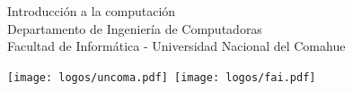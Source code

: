  {\centering \small 
    Introducción a la computación\\
    Departamento de Ingeniería de Computadoras \\
    Facultad de Informática - Universidad Nacional del Comahue \\
    \vspace{20pt} }
\makeatother

\vspace{-2.5cm}
\mbox{\hspace{-1cm}\texttt{[image: logos/uncoma.pdf]}\hspace{13cm}
    \texttt{[image: logos/fai.pdf]}}

